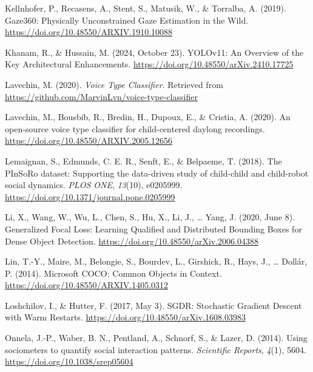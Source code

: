 \documentclass[
  man,floatsintext]{apa6}
\newlength{\cslhangindent}
\newenvironment{CSLReferences}[2] %
 {\begin{list}{}{%
  \setlength{\itemindent}{0pt}
  \setlength{\leftmargin}{0pt}
  \setlength{\parsep}{0pt}
  \ifodd #1
   \setlength{\leftmargin}{\cslhangindent}
   \setlength{\itemindent}{-1\cslhangindent}
  \fi
  \setlength{\itemsep}{#2\baselineskip}}}
 {\end{list}}
\begin{document}
\begin{CSLReferences}{1}{0}
Kellnhofer, P., Recasens, A., Stent, S., Matusik, W., \& Torralba, A. (2019). Gaze360: {Physically Unconstrained Gaze Estimation} in the {Wild}. \url{https://doi.org/10.48550/ARXIV.1910.10088}

Khanam, R., \& Hussain, M. (2024, October 23). {YOLOv11}: {An Overview} of the {Key Architectural Enhancements}. \url{https://doi.org/10.48550/arXiv.2410.17725}

Lavechin, M. (2020). \emph{Voice {Type Classifier}}. Retrieved from \url{https://github.com/MarvinLvn/voice-type-classifier}

Lavechin, M., Bousbib, R., Bredin, H., Dupoux, E., \& Cristia, A. (2020). An open-source voice type classifier for child-centered daylong recordings. \url{https://doi.org/10.48550/ARXIV.2005.12656}

Lemaignan, S., Edmunds, C. E. R., Senft, E., \& Belpaeme, T. (2018). The {PInSoRo} dataset: {Supporting} the data-driven study of child-child and child-robot social dynamics. \emph{PLOS ONE}, \emph{13}(10), e0205999. \url{https://doi.org/10.1371/journal.pone.0205999}

Li, X., Wang, W., Wu, L., Chen, S., Hu, X., Li, J., \ldots{} Yang, J. (2020, June 8). Generalized {Focal Loss}: {Learning Qualified} and {Distributed Bounding Boxes} for {Dense Object Detection}. \url{https://doi.org/10.48550/arXiv.2006.04388}

Lin, T.-Y., Maire, M., Belongie, S., Bourdev, L., Girshick, R., Hays, J., \ldots{} Dollár, P. (2014). Microsoft {COCO}: {Common Objects} in {Context}. \url{https://doi.org/10.48550/ARXIV.1405.0312}

Loshchilov, I., \& Hutter, F. (2017, May 3). {SGDR}: {Stochastic Gradient Descent} with {Warm Restarts}. \url{https://doi.org/10.48550/arXiv.1608.03983}

Onnela, J.-P., Waber, B. N., Pentland, A., Schnorf, S., \& Lazer, D. (2014). Using sociometers to quantify social interaction patterns. \emph{Scientific Reports}, \emph{4}(1), 5604. \url{https://doi.org/10.1038/srep05604}


\end{CSLReferences}
\end{document}
